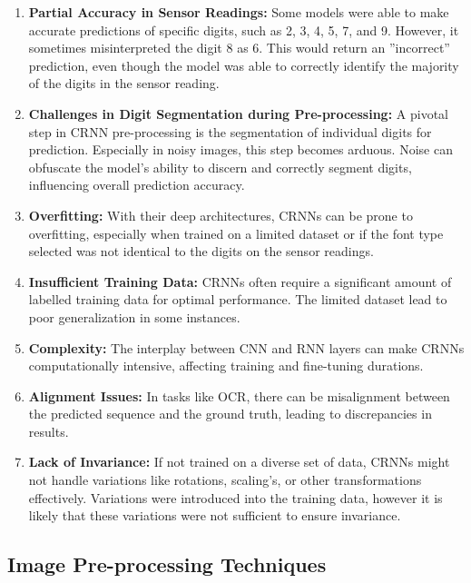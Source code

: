 \begin{enumerate}
    \item \textbf{Partial Accuracy in Sensor Readings:} Some models were able to make accurate predictions of specific digits, such as 2, 3, 4, 5, 7, and 9. However, it sometimes misinterpreted the digit 8 as 6. This would return an ''incorrect'' prediction, even though the model was able to correctly identify the majority of the digits in the sensor reading.

    \item \textbf{Challenges in Digit Segmentation during Pre-processing:} A pivotal step in CRNN pre-processing is the segmentation of individual digits for prediction. Especially in noisy images, this step becomes arduous. Noise can obfuscate the model's ability to discern and correctly segment digits, influencing overall prediction accuracy.

    \item \textbf{Overfitting:} With their deep architectures, CRNNs can be prone to overfitting, especially when trained on a limited dataset or if the font type selected was not identical to the digits on the sensor readings.

    \item \textbf{Insufficient Training Data:} CRNNs often require a significant amount of labelled training data for optimal performance. The limited dataset lead to poor generalization in some instances.

    \item \textbf{Complexity:} The interplay between CNN and RNN layers can make CRNNs computationally intensive, affecting training and fine-tuning durations.


    \item \textbf{Alignment Issues:} In tasks like OCR, there can be misalignment between the predicted sequence and the ground truth, leading to discrepancies in results.

    \item \textbf{Lack of Invariance:} If not trained on a diverse set of data, CRNNs might not handle variations like rotations, scaling's, or other transformations effectively. Variations were introduced into the training data, however it is likely that these variations were not sufficient to ensure invariance.

\end{enumerate}

\subsection{Image Pre-processing Techniques}

